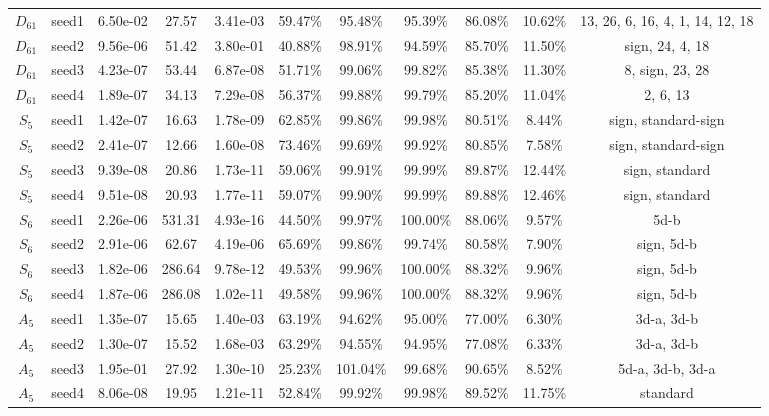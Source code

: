\begin{tabular}{ccccccccccc}
 $D_{61}$ & seed1 &  6.50e-02 &     27.57 &  3.41e-03 &   59.47\% &   95.48\% &   95.39\% & 86.08\% &            10.62\% & 13, 26, 6, 16, 4, 1, 14, 12, 18 \\
 $D_{61}$ & seed2 &  9.56e-06 &     51.42 &  3.80e-01 &   40.88\% &   98.91\% &   94.59\% & 85.70\% &            11.50\% &                 sign, 24, 4, 18 \\
 $D_{61}$ & seed3 &  4.23e-07 &     53.44 &  6.87e-08 &   51.71\% &   99.06\% &   99.82\% & 85.38\% &            11.30\% &                 8, sign, 23, 28 \\
 $D_{61}$ & seed4 &  1.89e-07 &     34.13 &  7.29e-08 &   56.37\% &   99.88\% &   99.79\% & 85.20\% &            11.04\% &                        2, 6, 13 \\
  $S_{5}$ & seed1 &  1.42e-07 &     16.63 &  1.78e-09 &   62.85\% &   99.86\% &   99.98\% & 80.51\% &             8.44\% &             sign, standard-sign \\
  $S_{5}$ & seed2 &  2.41e-07 &     12.66 &  1.60e-08 &   73.46\% &   99.69\% &   99.92\% & 80.85\% &             7.58\% &             sign, standard-sign \\
  $S_{5}$ & seed3 &  9.39e-08 &     20.86 &  1.73e-11 &   59.06\% &   99.91\% &   99.99\% & 89.87\% &            12.44\% &                  sign, standard \\
  $S_{5}$ & seed4 &  9.51e-08 &     20.93 &  1.77e-11 &   59.07\% &   99.90\% &   99.99\% & 89.88\% &            12.46\% &                  sign, standard \\
  $S_{6}$ & seed1 &  2.26e-06 &    531.31 &  4.93e-16 &   44.50\% &   99.97\% &  100.00\% & 88.06\% &             9.57\% &                            5d-b \\
  $S_{6}$ & seed2 &  2.91e-06 &     62.67 &  4.19e-06 &   65.69\% &   99.86\% &   99.74\% & 80.58\% &             7.90\% &                      sign, 5d-b \\
  $S_{6}$ & seed3 &  1.82e-06 &    286.64 &  9.78e-12 &   49.53\% &   99.96\% &  100.00\% & 88.32\% &             9.96\% &                      sign, 5d-b \\
  $S_{6}$ & seed4 &  1.87e-06 &    286.08 &  1.02e-11 &   49.58\% &   99.96\% &  100.00\% & 88.32\% &             9.96\% &                      sign, 5d-b \\
  $A_{5}$ & seed1 &  1.35e-07 &     15.65 &  1.40e-03 &   63.19\% &   94.62\% &   95.00\% & 77.00\% &             6.30\% &                      3d-a, 3d-b \\
  $A_{5}$ & seed2 &  1.30e-07 &     15.52 &  1.68e-03 &   63.29\% &   94.55\% &   94.95\% & 77.08\% &             6.33\% &                      3d-a, 3d-b \\
  $A_{5}$ & seed3 &  1.95e-01 &     27.92 &  1.30e-10 &   25.23\% &  101.04\% &   99.68\% & 90.65\% &             8.52\% &                5d-a, 3d-b, 3d-a \\
  $A_{5}$ & seed4 &  8.06e-08 &     19.95 &  1.21e-11 &   52.84\% &   99.92\% &   99.98\% & 89.52\% &            11.75\% &                        standard \\
\bottomrule
\end{tabular}
